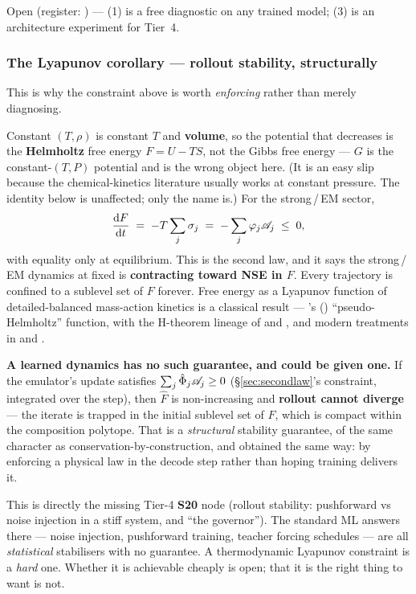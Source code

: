 Open (register: ) --- (1) is a free diagnostic on any trained model;
(3) is an architecture experiment for Tier~4.

\subsubsection{The Lyapunov corollary --- rollout stability, structurally}
\label{sec:lyapunov}

This is why the constraint above is worth \emph{enforcing} rather than merely
diagnosing.

Constant $(T, \rho)$ is constant $T$ and \textbf{volume}, so the potential that
decreases is the \textbf{Helmholtz} free energy $F = U - TS$, not the Gibbs free
energy --- $G$ is the constant-$(T, P)$ potential and is the wrong object here.
(It is an easy slip because the chemical-kinetics literature usually works at
constant pressure. The identity below is unaffected; only the name is.) For the
strong\,/\,EM sector,
%
\begin{equation}
\frac{\mathrm{d} F}{\mathrm{d} t} \;=\; -T\sum_j \sigma_j
\;=\; -\sum_j \varphi_j\mathscr{A}_j \;\le\; 0,
\label{eq:lyapunov}
\end{equation}
%
with equality only at equilibrium. This is the second law, and it says the
strong\,/\,EM dynamics at fixed \Ye{} is \textbf{contracting toward NSE in $F$}.
Every trajectory is confined to a sublevel set of $F$ forever. Free energy as a
Lyapunov function of detailed-balanced mass-action kinetics is a classical
result --- \citeauthor{hornjackson1972}'s (\citeyear{hornjackson1972})
``pseudo-Helmholtz'' function, with the H-theorem lineage of \citet{shear1967}
and \citet{higgins1968}, and modern treatments in \citet{vanderschaft2013} and
\citet{anderson2015}.

\begin{result}
\textbf{A learned dynamics has no such guarantee, and could be given one.} If
the emulator's update satisfies $\sum_j \hat{\Phi}_j\mathscr{A}_j \ge 0$
(\S\ref{sec:secondlaw}'s constraint, integrated over the step), then $\hat F$ is
non-increasing and \textbf{rollout cannot diverge} --- the iterate is trapped in
the initial sublevel set of $F$, which is compact within the composition
polytope. That is a \emph{structural} stability guarantee, of the same character
as conservation-by-construction, and obtained the same way: by enforcing a
physical law in the decode step rather than hoping training delivers it.
\end{result}

This is directly the missing Tier-4 \textbf{S20} node (rollout stability:
pushforward vs noise injection in a stiff system, and ``the governor''). The
standard ML answers there --- noise injection, pushforward training, teacher
forcing schedules --- are all \emph{statistical} stabilisers with no guarantee.
A thermodynamic Lyapunov constraint is a \emph{hard} one. Whether it is
achievable cheaply is open; that it is the right thing to want is not.

